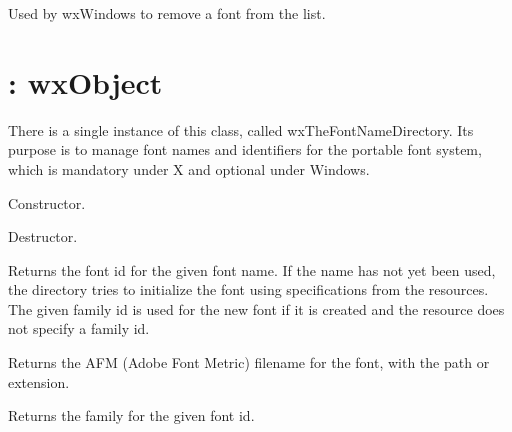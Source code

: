 

Used by wxWindows to remove a font from the list.


\section{: wxObject}\label{wxfontnamedirectory}


There is a single instance of this class, called wxTheFontNameDirectory.
Its purpose is to manage font names and identifiers for the portable font
system, which is mandatory under X and optional under Windows.



Constructor.



Destructor.



Returns the font id for the given font name. If the name has not yet been used,
the directory tries to initialize the font using specifications
from the resources. The given family id is used for the new font
if it is created and the resource does not specify a family id. 



Returns the AFM (Adobe Font Metric) filename for the font, with the path or extension.



Returns the family for the given font id.



